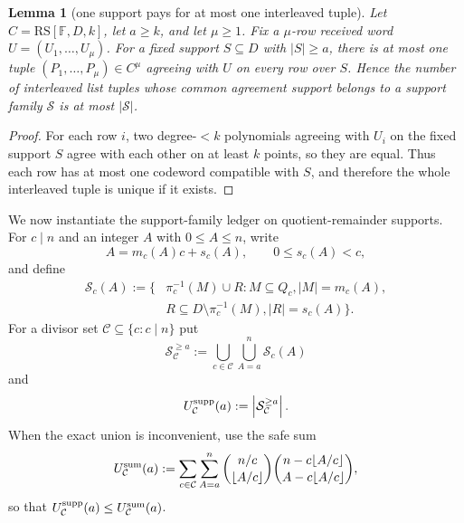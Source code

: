 \documentclass[11pt]{article}
\newtheorem{lemma}[theorem]{Lemma}
\theoremstyle{definition}
\theoremstyle{remark}
\newcommand{\F}{\mathbb{F}}
\newcommand{\RS}{\mathrm{RS}}
\begin{document}
\begin{lemma}[one support pays for at most one interleaved tuple]
\label{lem:one-support-one-interleaved}
Let $C=\RS[\F,D,k]$, let $a\ge k$, and let $\mu\ge1$.  Fix a $\mu$-row received
word $U=(U_1,\ldots,U_\mu)$.  For a fixed support $S\subseteq D$ with
$|S|\ge a$, there is at most one tuple $(P_1,\ldots,P_\mu)\in C^\mu$ agreeing
with $U$ on every row over $S$.  Hence the number of interleaved list tuples whose
common agreement support belongs to a support family $\mathcal S$ is at most
$|\mathcal S|$.
\end{lemma}

\begin{proof}
For each row $i$, two degree-$<k$ polynomials agreeing with $U_i$ on the fixed
support $S$ agree with each other on at least $k$ points, so they are equal.  Thus
each row has at most one codeword compatible with $S$, and therefore the whole
interleaved tuple is unique if it exists.
\end{proof}

We now instantiate the support-family ledger on quotient-remainder supports.  For
$c\mid n$ and an integer $A$ with $0\le A\le n$, write
\[
        A=m_c(A)c+s_c(A),\qquad 0\le s_c(A)<c,
\]
and define
\[
\begin{aligned}
        \mathcal S_c(A)
        :=\{&\pi_c^{-1}(M)\cup R:
          M\subseteq Q_c,
          |M|=m_c(A),\\
        & R\subseteq D\setminus\pi_c^{-1}(M),
          |R|=s_c(A)\} .
\end{aligned}
\]
For a divisor set $\mathcal C\subseteq\{c:c\mid n\}$ put
\[
        \mathcal S_{\mathcal C}^{\ge a}
        :=\bigcup_{c\in\mathcal C}\bigcup_{A=a}^n \mathcal S_c(A)
\]
and
\[
        U_{\mathcal C}^{\rm supp}(a)
        :=\left|\mathcal S_{\mathcal C}^{\ge a}\right|.
\]
When the exact union is inconvenient, use the safe sum
\[
\label{eq:quotient-support-safe-sum}
        U_{\mathcal C}^{\rm sum}(a)
        :=\sum_{c\in\mathcal C}\sum_{A=a}^n
          \binom{n/c}{\lfloor A/c\rfloor}
          \binom{n-c\lfloor A/c\rfloor}{A-c\lfloor A/c\rfloor},
\]
so that $U_{\mathcal C}^{\rm supp}(a)\le U_{\mathcal C}^{\rm sum}(a)$.
\end{document}
